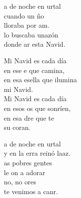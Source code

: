 \begin{cancion}[Mi Navidad][]%
	a de noche en urtal\\
	cuando un ño\\
	lloraba por am.\\
	lo buscaba unazón \\
	donde ar esta Navid.\jump\\
	\begin{chorus}%
		Mi Navid es cada día\\
		en ese e que camina,\\
		en esa esella que ilumina\\
		mi Navid.\\
		Mi Navid es cada día\\
		en esos os que sonríen,\\
		en esa dre que te \\
		su coran. \jump\\
	\end{chorus}%
	a de noche en urtal\\
	y en la erra reinó laaz.\\
	as pobres gentes\\
	le on a adorar\\
	no, no ores\\
	te venimos a canr.\\
\end{cancion}%
